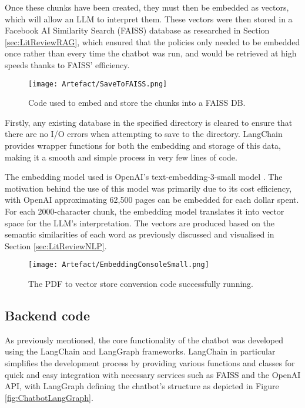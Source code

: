 \para Once these chunks have been created, they must then be embedded as vectors, which will allow an LLM to interpret them. These 
vectors were then stored in a Facebook AI Similarity Search (FAISS) database as researched in Section \ref{sec:LitReviewRAG}, which 
ensured that the policies only needed to be embedded once rather than every time the chatbot was run, and would be retrieved 
at high speeds thanks to FAISS' efficiency.

\begin{figure}[H]
    \centering
    \texttt{[image: Artefact/SaveToFAISS.png]}
    \caption{Code used to embed and store the chunks into a FAISS DB. \label{fig:LangChainStoreFAISS}}
\end{figure}

\noindent Firstly, any existing database in the specified directory is cleared to ensure that there are no I/O errors when attempting 
to save to the directory. LangChain provides wrapper functions for both the embedding and storage of this data, making it a smooth 
and simple process in very few lines of code. 

\para The embedding model used is OpenAI's text-embedding-3-small model \autocite{openai_vector_nodate}. The motivation behind the use of this model 
was primarily due to its cost efficiency, with OpenAI approximating 62,500 pages can be embedded for each dollar spent. For each 
2000-character chunk, the embedding model translates it into vector space for the LLM's interpretation. The vectors are produced based on the 
semantic similarities of each word as previously discussed and visualised in Section \ref{sec:LitReviewNLP}. 

\begin{figure}[H]
    \centering
    \texttt{[image: Artefact/EmbeddingConsoleSmall.png]}
    \caption{The PDF to vector store conversion code successfully running. \label{fig:EmbeddingConsole}}
\end{figure}



\subsection{Backend code}\label{sec:ChatbotBackend}
As previously mentioned, the core functionality of the chatbot was developed using the LangChain and LangGraph frameworks. LangChain in particular
simplifies the development process by providing various functions and classes for quick and easy integration with necessary services such 
as FAISS and the OpenAI API, with LangGraph defining the chatbot's structure as depicted in Figure \ref{fig:ChatbotLangGraph}. 

